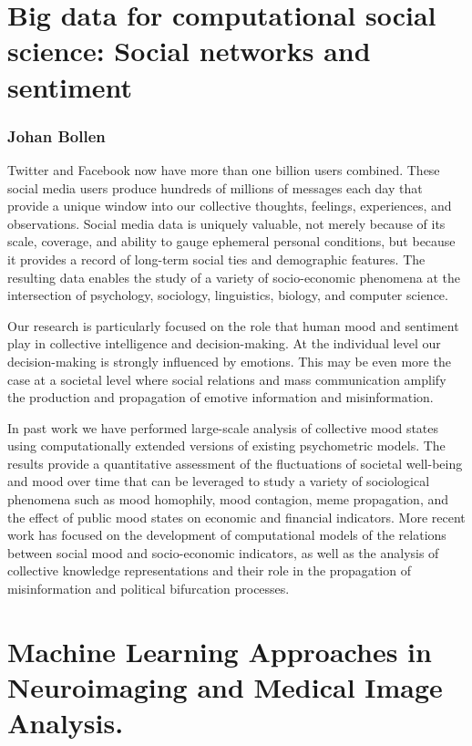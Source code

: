 \documentclass[10pt,letterpaper]{article}
\begin{document}
\section{Big data for computational social science: Social networks and sentiment}
\subsubsection{Johan Bollen}

Twitter and Facebook now have more than one billion users combined. These social media
users produce hundreds of millions of messages each day that provide a unique window into
our collective thoughts, feelings, experiences, and observations. Social media data is
uniquely valuable, not merely because of its scale, coverage, and ability to gauge
ephemeral personal conditions, but because it provides a record of long-term social ties
and demographic features. The resulting data enables the study of a variety of
socio-economic phenomena at the intersection of psychology, sociology, linguistics,
biology, and computer science.

Our research is particularly focused on the role that human mood and sentiment play in
collective intelligence and decision-making. At the individual level our decision-making
is strongly influenced by emotions. This may be even more the case at a societal level
where social relations and mass communication amplify the production and propagation of
emotive information and misinformation.

In past work we have performed large-scale analysis of collective mood states using
computationally extended versions of existing psychometric models. The results provide a
quantitative assessment of the fluctuations of societal well-being and mood over time that
can be leveraged to study a variety of sociological phenomena such as mood homophily, mood
contagion, meme propagation, and the effect of public mood states on economic and
financial indicators. More recent work has focused on the development of computational
models of the relations between social mood and socio-economic indicators, as well as the
analysis of collective knowledge representations and their role in the propagation of
misinformation and political bifurcation processes.


\section{Machine Learning Approaches in Neuroimaging and Medical Image Analysis.}
\end{document}
